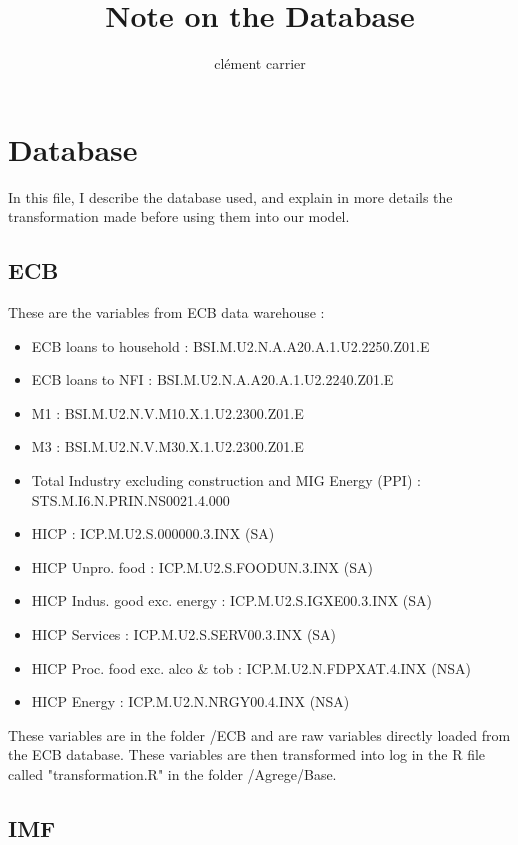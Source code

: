 \documentclass[11pt,a4paper]{article}
\title{Note on the Database}
\author{clément carrier}
\begin{document}
\maketitle

\section{Database}

In this file, I describe the database used, and explain in more details the transformation made before using them into our model. 

\subsection{ECB}

These are the variables from ECB data warehouse :
\begin{itemize}
\item ECB loans to household : BSI.M.U2.N.A.A20.A.1.U2.2250.Z01.E
\item ECB loans to NFI : BSI.M.U2.N.A.A20.A.1.U2.2240.Z01.E
\item M1 : BSI.M.U2.N.V.M10.X.1.U2.2300.Z01.E
\item M3 : BSI.M.U2.N.V.M30.X.1.U2.2300.Z01.E
\item Total Industry excluding construction and MIG Energy (PPI) : STS.M.I6.N.PRIN.NS0021.4.000
\item HICP : ICP.M.U2.S.000000.3.INX (SA)
\item HICP Unpro. food : ICP.M.U2.S.FOODUN.3.INX (SA)
\item HICP Indus. good exc. energy : ICP.M.U2.S.IGXE00.3.INX (SA)
\item HICP Services : ICP.M.U2.S.SERV00.3.INX (SA)
\item HICP Proc. food exc. alco \& tob : ICP.M.U2.N.FDPXAT.4.INX (NSA)
\item HICP Energy : ICP.M.U2.N.NRGY00.4.INX (NSA)
\end{itemize}

\vspace{0.5cm}

These variables are in the folder /ECB and are raw variables directly loaded from the ECB database. These variables are then transformed into log in the R file called "transformation.R" in the folder /Agrege/Base. 

\subsection{IMF}
\end{document}
